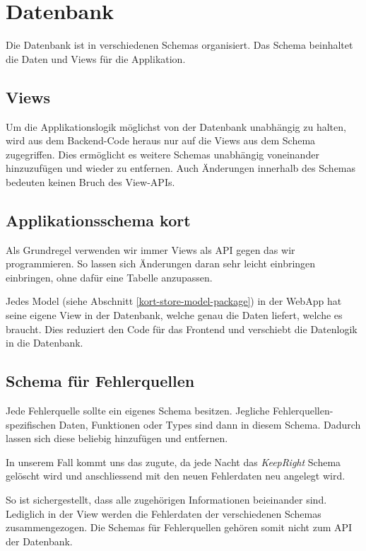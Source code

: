 \section{Datenbank}
Die Datenbank ist in verschiedenen Schemas organisiert.
Das Schema  beinhaltet die Daten und Views für die Applikation.

\subsection{Views}
Um die Applikationslogik möglichst von der Datenbank unabhängig zu halten, wird aus dem Backend-Code heraus nur auf die Views aus dem Schema  zugegriffen.
Dies ermöglicht es weitere Schemas unabhängig voneinander hinzuzufügen und wieder zu entfernen.
Auch Änderungen innerhalb des Schemas bedeuten keinen Bruch des View-\glspl{API}.

\subsection{Applikationsschema kort}
Als Grundregel verwenden wir immer Views als \gls{API} gegen das wir programmieren.
So lassen sich Änderungen daran sehr leicht einbringen einbringen, ohne dafür eine Tabelle anzupassen.

Jedes Model (siehe Abschnitt \ref{kort-store-model-package})  in der \gls{WebApp} hat seine eigene View in der Datenbank, welche genau die Daten liefert, welche es braucht.
Dies reduziert den Code für das Frontend und verschiebt die Datenlogik in die Datenbank.

\subsection{Schema für Fehlerquellen}
Jede Fehlerquelle sollte ein eigenes Schema besitzen.
Jegliche Fehlerquellen-spezifischen Daten, Funktionen oder Types sind dann in diesem Schema.
Dadurch lassen sich diese beliebig hinzufügen und entfernen.

In unserem Fall kommt uns das zugute, da jede Nacht das \emph{KeepRight} Schema gelöscht wird und anschliessend mit den neuen Fehlerdaten neu angelegt wird.

So ist sichergestellt, dass alle zugehörigen Informationen beieinander sind.
Lediglich in der View  werden die Fehlerdaten der verschiedenen Schemas zusammengezogen.
Die Schemas für Fehlerquellen gehören somit nicht zum \gls{API} der Datenbank.

